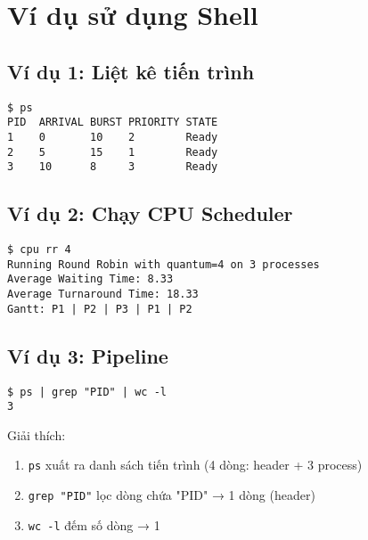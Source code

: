 \section{Ví dụ sử dụng Shell}

\subsection{Ví dụ 1: Liệt kê tiến trình}

\begin{verbatim}
$ ps
PID  ARRIVAL BURST PRIORITY STATE
1    0       10    2        Ready
2    5       15    1        Ready
3    10      8     3        Ready
\end{verbatim}

\subsection{Ví dụ 2: Chạy CPU Scheduler}

\begin{verbatim}
$ cpu rr 4
Running Round Robin with quantum=4 on 3 processes
Average Waiting Time: 8.33
Average Turnaround Time: 18.33
Gantt: P1 | P2 | P3 | P1 | P2
\end{verbatim}

\subsection{Ví dụ 3: Pipeline}

\begin{verbatim}
$ ps | grep "PID" | wc -l
3
\end{verbatim}

Giải thích:
\begin{enumerate}[leftmargin=1.5cm]
  \item \texttt{ps} xuất ra danh sách tiến trình (4 dòng: header + 3 process)
  \item \texttt{grep "PID"} lọc dòng chứa "PID" → 1 dòng (header)
  \item \texttt{wc -l} đếm số dòng → 1
\end{enumerate}

\clearpage
